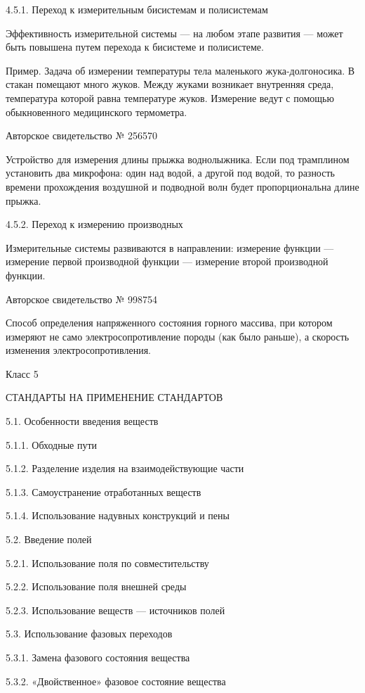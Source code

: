 4.5.1. Переход к измерительным бисистемам и полисистемам

Эффективность измерительной системы — на  любом этапе развития — может
быть повышена путем перехода к бисистеме и полисистеме.

Пример.    Задача   об    измерении   температуры    тела   маленького
жука-долгоносика.  В   стакан  помещают  много  жуков.   Между  жуками
возникает  внутренняя  среда,  температура которой  равна  температуре
жуков.   Измерение   ведут   с  помощью   обыкновенного   медицинского
термометра.


Авторское свидетельство № 256570

Устройство  для   измерения  длины   прыжка  воднолыжника.   Если  под
трамплином  установить два  микрофона: один  над водой,  а другой  под
водой,  то разность  времени  прохождения воздушной  и подводной  волн
будет пропорциональна длине прыжка.


4.5.2. Переход к измерению производных

Измерительные системы  развиваются в направлении: измерение  функции —
измерение первой  производной функции  — измерение  второй производной
функции.


Авторское свидетельство № 998754

Способ определения напряженного состояния горного массива, при котором
измеряют  не само  электросопротивление  породы (как  было раньше),  а
скорость изменения электросопротивления.


Класс 5

СТАНДАРТЫ НА ПРИМЕНЕНИЕ СТАНДАРТОВ

5.1. Особенности введения веществ

5.1.1. Обходные пути

5.1.2. Разделение изделия на взаимодействующие части

5.1.3. Самоустранение отработанных веществ

5.1.4. Использование надувных конструкций и пены

5.2. Введение полей

5.2.1. Использование поля по совместительству

5.2.2. Использование поля внешней среды

5.2.3. Использование веществ — источников полей

5.3. Использование фазовых переходов

5.3.1. Замена фазового состояния вещества

5.3.2. «Двойственное» фазовое состояние вещества

